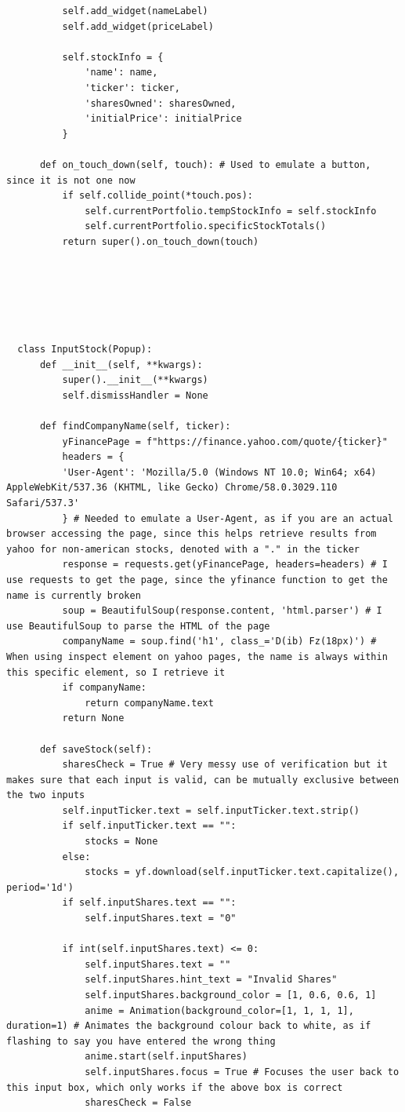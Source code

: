\documentclass{article}
\begin{document}
\begin{verbatim}
          self.add_widget(nameLabel)
          self.add_widget(priceLabel)

          self.stockInfo = {
              'name': name,
              'ticker': ticker,
              'sharesOwned': sharesOwned,
              'initialPrice': initialPrice
          }

      def on_touch_down(self, touch): # Used to emulate a button, since it is not one now
          if self.collide_point(*touch.pos):
              self.currentPortfolio.tempStockInfo = self.stockInfo
              self.currentPortfolio.specificStockTotals()
          return super().on_touch_down(touch)






  class InputStock(Popup):
      def __init__(self, **kwargs):
          super().__init__(**kwargs)
          self.dismissHandler = None

      def findCompanyName(self, ticker):
          yFinancePage = f"https://finance.yahoo.com/quote/{ticker}"
          headers = {
          'User-Agent': 'Mozilla/5.0 (Windows NT 10.0; Win64; x64) AppleWebKit/537.36 (KHTML, like Gecko) Chrome/58.0.3029.110 Safari/537.3'
          } # Needed to emulate a User-Agent, as if you are an actual browser accessing the page, since this helps retrieve results from yahoo for non-american stocks, denoted with a "." in the ticker
          response = requests.get(yFinancePage, headers=headers) # I use requests to get the page, since the yfinance function to get the name is currently broken
          soup = BeautifulSoup(response.content, 'html.parser') # I use BeautifulSoup to parse the HTML of the page
          companyName = soup.find('h1', class_='D(ib) Fz(18px)') # When using inspect element on yahoo pages, the name is always within this specific element, so I retrieve it
          if companyName:
              return companyName.text
          return None

      def saveStock(self):
          sharesCheck = True # Very messy use of verification but it makes sure that each input is valid, can be mutually exclusive between the two inputs
          self.inputTicker.text = self.inputTicker.text.strip()
          if self.inputTicker.text == "":
              stocks = None        
          else:
              stocks = yf.download(self.inputTicker.text.capitalize(), period='1d')
          if self.inputShares.text == "":
              self.inputShares.text = "0"

          if int(self.inputShares.text) <= 0:
              self.inputShares.text = ""
              self.inputShares.hint_text = "Invalid Shares"
              self.inputShares.background_color = [1, 0.6, 0.6, 1]
              anime = Animation(background_color=[1, 1, 1, 1], duration=1) # Animates the background colour back to white, as if flashing to say you have entered the wrong thing
              anime.start(self.inputShares)
              self.inputShares.focus = True # Focuses the user back to this input box, which only works if the above box is correct
              sharesCheck = False


\end{verbatim}
\end{document}
